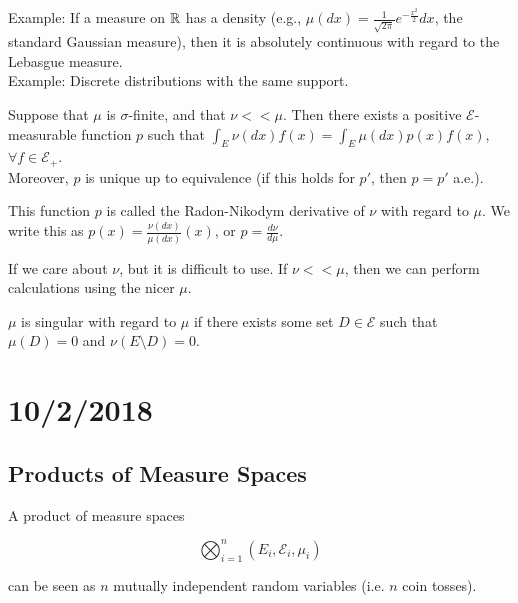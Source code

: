 \documentclass[english, course]{Notes}
\begin{document}
Example: If a measure on $\mathbb{R}$ has a density (e.g., $\mu(dx) = \frac{1}{\sqrt{2\pi}} e^{-\frac{x^2}{2}} dx$, the standard Gaussian measure), then it is absolutely continuous with regard to the Lebasgue measure.\\

Example: Discrete distributions with the same support.\\

\begin{theorem}
Suppose that $\mu$ is $\sigma$-finite, and that $\nu << \mu$. Then there exists a positive $\mathcal{E}$-measurable function $p$ such that $\int_E \nu(dx) f(x) = \int_E \mu(dx) p(x)f(x)$, $\forall f \in \mathcal{E}_+$.\\

Moreover, $p$ is unique up to equivalence (if this holds for $p'$, then $p = p'$ a.e.).\\
\end{theorem}

\begin{definition}
This function $p$ is called the Radon-Nikodym derivative of $\nu$ with regard to $\mu$. We write this as $p(x) = \frac{\nu(dx)}{\mu(dx)}(x)$, or $p = \frac{d\nu}{d\mu}$.\\
\end{definition}

If we care about $\nu$, but it is difficult to use. If $\nu << \mu$, then we can perform calculations using the nicer $\mu$.\\

\begin{definition}
$\mu$ is singular with regard to $\mu$ if there exists some set $D \in \mathcal{E}$ such that $\mu(D) = 0$ and $\nu(E \setminus D) = 0$.
\end{definition}

\section{10/2/2018}

\subsection{Products of Measure Spaces}

A product of measure spaces 

\[\bigotimes_{i = 1}^n (E_i, \mathcal{E}_i, \mu_i)\]

can be seen as $n$ mutually independent random variables (i.e. $n$ coin tosses).\\
\end{document}
